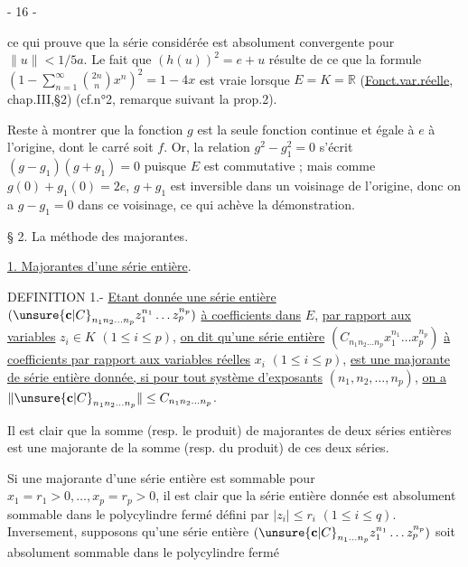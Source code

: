 \begin{center}
- 16 -
\end{center}

ce qui prouve que la série considérée est absolument convergente pour
$\|u\|<1/5a$. Le fait que $(h(u))^2=e+u$ résulte de ce que la formule
$(1-\sum_{n=1}^{\infty}\binom{2n}{n}x^n)^2=1-4x$ est vraie lorsque
$E=K=\mathbb R$ (\uline{Fonct.var.réelle}, chap.III,§2)
(cf.n°2, remarque suivant la prop.2).

Reste à montrer que la fonction $g$ est la seule fonction continue et égale
à $e$ à l'origine, dont le carré soit $f$. Or, la relation $g^2-g_1^2=0$
s'écrit $(g-g_1)(g+g_1)=0$ puisque $E$ est commutative ; mais comme
$g(0)+g_1(0)=2e$, $g+g_1$ est inversible dans un voisinage de l'origine,
donc on a $g-g_1=0$ dans ce voisinage, ce qui achève la démonstration.

\begin{center}
§ 2. La méthode des majorantes.
\end{center}

\uline{1. Majorantes d'une série entière}.

DEFINITION 1.- \uline{Etant donnée une série entière}
$(\unsure{\mathbf c|C}_{n_1n_2\ldots n_p}z_1^{n_1}\ldots z_p^{n_p})$
\uline{à coefficients dans} $E$, \uline{par rapport aux variables}
$z_i\in K$ $(1\leq i\leq p)$,
\uline{on dit qu'une série entière}
$(C_{n_1n_2\ldots n_p}x_1^{n_1}\ldots x_p^{n_p})$
\uline{à coefficients }
\uline{par rapport aux variables réelles} $x_i$ $(1\leq i\leq p)$,
\uline{est une majorante de  série entière donnée, si pour tout système d'exposants}
$(n_1,n_2,\ldots,n_p)$, \uline{on a}
$\|\unsure{\mathbf c|C}_{n_1n_2\ldots n_p}\|\leq C_{n_1n_2\ldots n_p}$.

Il est clair que la somme (resp. le produit) de majorantes de deux séries
entières est une majorante de la somme (resp. du produit) de ces deux séries.

Si une majorante d'une série entière est sommable pour
$x_1=r_1>0,\ldots,x_p=r_p>0$, il est clair que la série entière donnée
est absolument sommable dans le polycylindre fermé défini par
$|z_i|\leq r_i$ $(1\leq i\leq q)$.
Inversement, supposons qu'une série entière
$(\unsure{\mathbf c|C}_{n_1\ldots n_p}z_1^{n_1}\ldots z_p^{n_p})$
soit absolument sommable dans le polycylindre fermé
